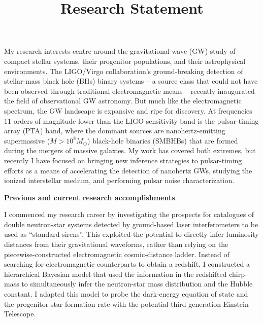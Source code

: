\documentclass[11pt,letterpaper,sans]{moderncv} %
\title{\huge{Research Statement}}
\begin{document}
\makecvtitle %
\vspace{-6mm}

My research interests centre around the gravitational-wave (GW) study of compact stellar systems, their progenitor populations, and their astrophysical environments. The LIGO/Virgo collaboration's ground-breaking detection of stellar-mass black hole (BHs) binary systems -- a source class that could not have been observed through traditional electromagnetic means -- recently inaugurated the field of observational GW astronomy. But much like the electromagnetic spectrum, the GW landscape is expansive and ripe for discovery. At frequencies 11 orders of magnitude lower than the LIGO sensitivity band is the pulsar-timing array (PTA) band, where the dominant sources are nanohertz-emitting supermassive ($M > 10^8M_\odot$) black-hole binaries (SMBHBs) that are formed during the mergers of massive galaxies. My work has covered both extremes, but recently I have focused on bringing new inference strategies to pulsar-timing efforts as a means of accelerating the detection of nanohertz GWs, studying the ionized interstellar medium, and performing pulsar noise characterization.
\vspace{1mm}

\textbf{Previous and current research accomplishments}
\vspace{1mm}

I commenced my research career by investigating the prospects for catalogues of double neutron-star systems detected by ground-based laser interferometers to be used as ``standard sirens''. This exploited the potential to directly infer luminosity distances from their gravitational waveforms, rather than relying on the piecewise-constructed electromagnetic cosmic-distance ladder. Instead of searching for electromagnetic counterparts to obtain a redshift, I constructed a hierarchical Bayesian model that used the information in the redshifted chirp-mass to simultaneously infer the neutron-star mass distribution and the Hubble constant. %
I adapted this model to probe the dark-energy equation of state and the progenitor star-formation rate with the potential third-generation Einstein Telescope.
\vspace{1mm}
\end{document}
